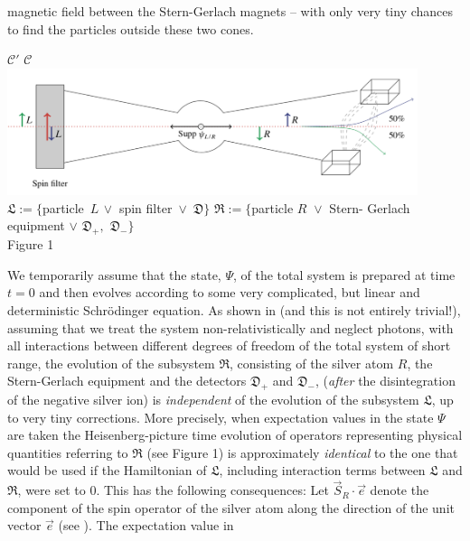 \documentclass[12pt]{article}
\begin{document}
magnetic field between the Stern-Gerlach magnets -- with only very tiny chances to find the particles outside these
two cones.
\begin{center}
 $\mathcal{C'}$ \hspace{5.2cm} $\mathcal{C}$\\
\includegraphics[width=12cm]{Spin-Filter.png}\\
\small{
$ \mathfrak{L}:=\lbrace$particle\, $L\, \vee $ spin filter\, $\vee$\, $\mathfrak{D} \rbrace$ \hspace{0.5cm} $\mathfrak{R}:=\{$particle $R \,\,\vee$ Stern-
Gerlach equipment $\vee  \,\, \mathfrak{D}_{+}, \,\,\mathfrak{D}_{-}\}$
}\\
\vspace{0.2cm}
{Figure 1}
\end{center}
We temporarily assume that the state, $\Psi$, of the total system is prepared at time $t=0$ and
then evolves according to some very complicated, but linear and deterministic Schr\"odinger equation.
As shown in \cite{FFS} (and this is not entirely trivial!), assuming that we treat the system non-relativistically
and neglect photons, with all interactions between different degrees of freedom of the total system of
short range, the evolution of the subsystem $\mathfrak{R}$, consisting of the silver atom $R$,
the Stern-Gerlach equipment and  the detectors $\mathfrak{D}_{+}$ and $\mathfrak{D}_{-}$, (\textit{after} the
disintegration of the negative silver ion) is \textit{independent} of the evolution of the subsystem $\mathfrak{L}$,
up to very tiny corrections. More precisely, when expectation values in the state $\Psi$ are taken the Heisenberg-picture
time evolution of operators representing physical quantities referring to $\mathfrak{R}$
 (see {Figure 1}) is approximately \textit{identical} to the one that
would be used if the Hamiltonian of $\mathfrak{L}$, including interaction terms between $\mathfrak{L}$ and $\mathfrak{R}$,
were set to 0. This has the following consequences: Let $\vec{S}_{R}\cdot \vec{e}$ denote the component of the spin
operator of the silver atom along the direction of the unit vector $\vec{e}$ (see \cite{FFS}). The expectation value in
\end{document}
